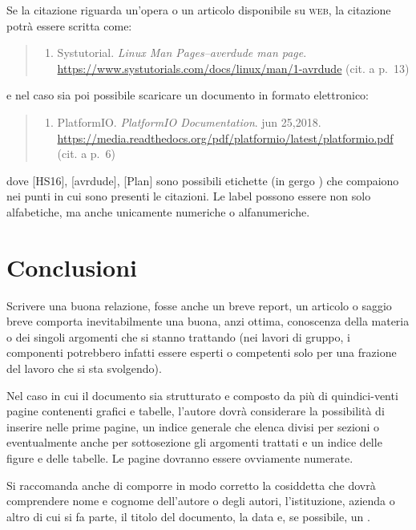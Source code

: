 Se la citazione riguarda un'opera o un articolo disponibile su \textsc{web}, la citazione potrà essere scritta come:
		\begin{quote}\small
			\begin{enumerate}[leftmargin=25mm]
				\item[$\textlbrackdbl$avrdude$\textrbrackdbl$] Systutorial. \textit{Linux Man Pages--averdude man page}. \url{https://www.systutorials.com/docs/linux/man/1-avrdude} (cit. a p.~13)
			\end{enumerate}
		\end{quote}
e nel caso sia poi possibile scaricare un documento in formato elettronico:
		\begin{quote}\small
			\begin{enumerate}[leftmargin=25mm]
				\item[$\textlbrackdbl$Plan$\textrbrackdbl$] PlatformIO. \textit{PlatformIO Documentation}. jun 25,2018. \url{https://media.readthedocs.org/pdf/platformio/latest/platformio.pdf} (cit. a p.~6)
			\end{enumerate}
		\end{quote}
dove [HS16], [avrdude], [Plan] sono possibili etichette (in gergo ) che compaiono nei punti in cui sono presenti le citazioni. Le label possono essere non solo alfabetiche, ma anche unicamente numeriche o alfanumeriche.


					\section{Conclusioni}

Scrivere una buona relazione, fosse anche un breve report, un articolo o saggio breve comporta inevitabilmente una buona, anzi ottima, conoscenza della materia o dei singoli argomenti che si stanno trattando (nei lavori di gruppo, i componenti potrebbero infatti essere esperti o competenti solo per una frazione del lavoro che si sta svolgendo).

Nel caso in cui il documento sia strutturato e composto da più di quindici-venti pagine contenenti grafici e tabelle, l'autore dovrà considerare la possibilità di inserire nelle prime pagine, un indice generale che elenca divisi per sezioni o eventualmente anche per sottosezione gli argomenti trattati e un indice delle figure e delle tabelle. Le pagine dovranno essere ovviamente numerate.

Si raccomanda anche di comporre in modo corretto la cosiddetta  che dovrà comprendere nome e cognome dell'autore o degli autori, l'istituzione, azienda o altro di cui si fa parte, il titolo del documento, la data e, se possibile, un .

